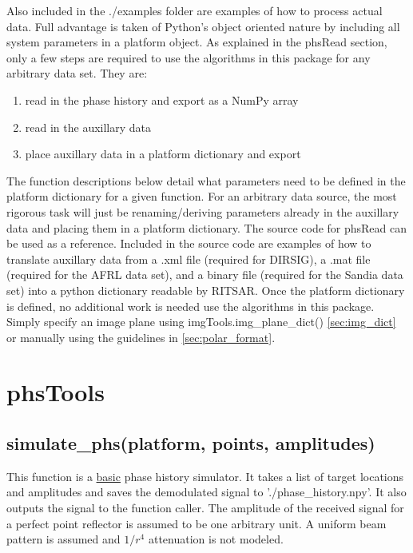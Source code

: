 \documentclass{article}
\begin{document}
Also included in the ./examples folder are examples of how to process actual data.  Full advantage is taken of Python's object oriented nature by including all system parameters in a platform object.  As explained in the phsRead section, only a few steps are required to use the algorithms in this package for any arbitrary data set.  They are:
\begin{enumerate}
\item read in the phase history and export as a NumPy array
\item read in the auxillary data
\item place auxillary data in a platform dictionary and export
\end{enumerate}
The function descriptions below detail what parameters need to be defined in the platform dictionary for a given function.  For an arbitrary data source, the most rigorous task will just be renaming/deriving parameters already in the auxillary data and placing them in a platform dictionary.  The source code for phsRead can be used as a reference.  Included in the source code are examples of how to translate auxillary data from a .xml file (required for DIRSIG), a .mat file (required for the AFRL data set), and a binary file (required for the Sandia data set) into a python dictionary readable by RITSAR.  Once the platform dictionary is defined, no additional work is needed use the algorithms in this package.  Simply specify an image plane using imgTools.img\_plane\_dict() \ref{sec:img_dict} or manually using the guidelines in \ref{sec:polar_format}.

\newpage


\section{phsTools}


\subsection{simulate\_phs(platform, points, amplitudes)}
\label{simulate_phs}
This function is a \underline{basic} phase history simulator.  It takes a list of target locations and amplitudes and saves the demodulated signal to './phase\_history.npy'.  It also outputs the signal to the function caller.  The amplitude of the received signal for a perfect point reflector is assumed to be one arbitrary unit.  A uniform beam pattern is assumed and $1/r^4$ attenuation is not modeled.\\
\end{document}
